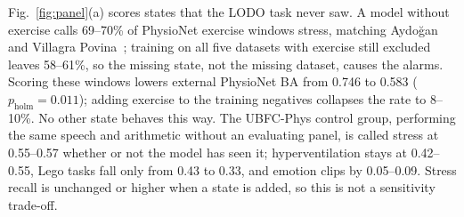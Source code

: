 \documentclass[journal]{IEEEtran}
\begin{document}
Fig.~\ref{fig:panel}(a) scores states that the LODO task never saw. A model without exercise calls 69--70\% of PhysioNet exercise windows stress, matching Aydo\u{g}an and Villagra Povina~\cite{aydogan2026}; training on all five datasets with exercise still excluded leaves 58--61\%, so the missing state, not the missing dataset, causes the alarms. Scoring these windows lowers external PhysioNet BA from 0.746 to 0.583 ($p_{\mathrm{holm}}=0.011$); adding exercise to the training negatives collapses the rate to 8--10\%. No other state behaves this way. The UBFC-Phys control group, performing the same speech and arithmetic without an evaluating panel, is called stress at 0.55--0.57 whether or not the model has seen it; hyperventilation stays at 0.42--0.55, Lego tasks fall only from 0.43 to 0.33, and emotion clips by 0.05--0.09. Stress recall is unchanged or higher when a state is added, so this is not a sensitivity trade-off.
\end{document}
